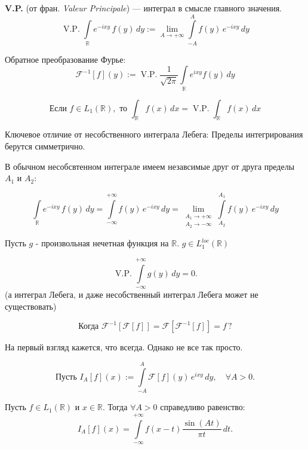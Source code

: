 \begin{note}
\textbf{V.P.} (от фран. \textit{Valeur Principale}) — интеграл в смысле главного значения.
\[
\operatorname{V.P.}\int\limits_{\mathbb{R}} e^{-ixy} \, f(y) \, dy := \lim_{A \to +\infty} \int\limits_{-A}^{A} f(y) \, e^{-ixy} \, dy
\]
\end{note}

Обратное преобразование Фурье:
\[
\mathcal{F}^{-1} \left[ f \right](y) := \operatorname{V.P.} \frac{1}{\sqrt{2 \pi}} \int\limits_{\mathbb{R}} e^{ixy} f(y) \, dy
\]

\begin{note}
\[
\text{Если  }f \in L_1(\mathbb{R}), \text{ то } \int_{\mathbb{R}} f(x) \, dx = \operatorname{V.P.} \int_{\mathbb{R}} f(x) \, dx
\]
\end{note}


Ключевое отличие от несобственного интеграла Лебега:
Пределы интегрирования берутся симметрично.

В обычном несобсвтенном интеграле имеем незавсимые друг от друга пределы $A_1$ и $A_2$:

\[
\int\limits_{\mathbb{R}} e^{-ixy} \, f(y) \, dy 
= \int\limits_{-\infty}^{+\infty} f(y) \, e^{-ixy} \, dy
= \lim_{\substack{A_1 \to +\infty \\ A_2 \to -\infty}} \int\limits_{A_2}^{A_1} f(y) \, e^{-ixy} \, dy
\]

\begin{example}

Пусть $g$ - произвольная нечетная функция на $\mathbb{R}$. $g \in L_1^{loc}(\mathbb{R})$

\[
\operatorname{V.P.} \int\limits_{-\infty}^{+\infty} g(y) \, dy = 0.
\]
(а интеграл Лебега, и даже несобственный интеграл Лебега может не существовать)

\end{example}

\begin{question}

\[
\text{Когда }\mathcal{F}^{-1} \left[\mathcal{F} \left[f \right]\right] = \mathcal{F} \left[\mathcal{F}^{-1} \left[f \right]\right] = f \, ?
\]
\end{question}

На первый взгляд кажется, что всегда. Однако не все так просто.


\[
\text{Пусть }I_A [f](x) := \int\limits_{-A}^{A} \mathcal{F}[f](y) \, e^{ixy} \, dy, \quad \forall A > 0.
\]

\begin{lemma}[Ключевая]\label{lem:key}
Пусть $f \in L_1(\mathbb{R})$ и $x \in \mathbb{R}$. Тогда $\forall A > 0$ справедливо равенство:
\[
I_A \left[ f \right](x) = \int\limits_{-\infty}^{+\infty} f(x - t) \frac{\sin(At)}{\pi t} \, dt.
\]
\end{lemma}

